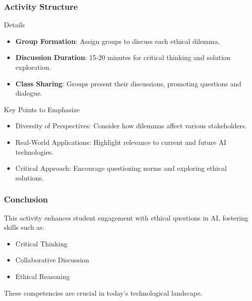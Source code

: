 \documentclass[aspectratio=169]{beamer}
\begin{document}
\begin{frame}[fragile]
    \frametitle{Activity Structure}
    \begin{block}{Details}
        \begin{itemize}
            \item \textbf{Group Formation}: Assign groups to discuss each ethical dilemma.
            \item \textbf{Discussion Duration}: 15-20 minutes for critical thinking and solution exploration.
            \item \textbf{Class Sharing}: Groups present their discussions, promoting questions and dialogue.
        \end{itemize}
    \end{block}
    
    \begin{block}{Key Points to Emphasize}
        \begin{itemize}
            \item Diversity of Perspectives: Consider how dilemmas affect various stakeholders.
            \item Real-World Applications: Highlight relevance to current and future AI technologies.
            \item Critical Approach: Encourage questioning norms and exploring ethical solutions.
        \end{itemize}
    \end{block}
\end{frame}

\begin{frame}[fragile]
    \frametitle{Conclusion}
    This activity enhances student engagement with ethical questions in AI, fostering skills such as:
    \begin{itemize}
        \item Critical Thinking
        \item Collaborative Discussion
        \item Ethical Reasoning
    \end{itemize}
    These competencies are crucial in today's technological landscape.
\end{frame}
\end{document}
